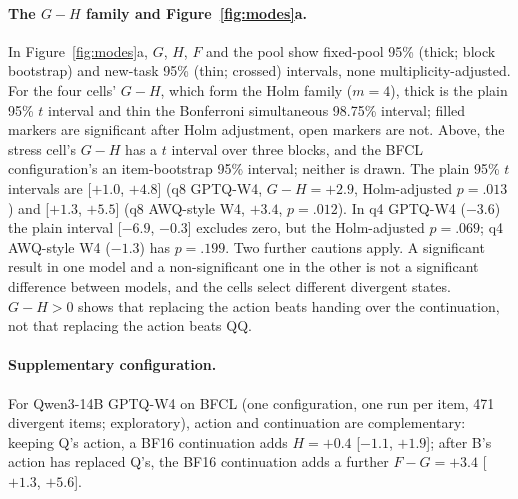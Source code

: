 \paragraph{The $G-H$ family and Figure~\ref{fig:modes}a.} In Figure~\ref{fig:modes}a, $G$, $H$, $F$ and the pool show fixed-pool 95\% (thick; block bootstrap) and new-task 95\% (thin; crossed) intervals, none multiplicity-adjusted. For the four cells' $G-H$, which form the Holm family ($m=4$), thick is the plain 95\% $t$ interval and thin the Bonferroni simultaneous 98.75\% interval; filled markers are significant after Holm adjustment, open markers are not. Above, the stress cell's $G-H$ has a $t$ interval over three blocks, and the BFCL configuration's an item-bootstrap 95\% interval; neither is drawn. %
The plain 95\% $t$ intervals are [$+1.0$, $+4.8$] (q8 GPTQ-W4, $G-H=+2.9$, Holm-adjusted $p=.013$) and [$+1.3$, $+5.5$] (q8 AWQ-style W4, $+3.4$, $p=.012$). In q4 GPTQ-W4 ($-3.6$) the plain interval [$-6.9$, $-0.3$] excludes zero, but the Holm-adjusted $p=.069$; q4 AWQ-style W4 ($-1.3$) has $p=.199$. Two further cautions apply. A significant result in one model and a non-significant one in the other is not a significant difference between models, and the cells select different divergent states. $G-H>0$ shows that replacing the action beats handing over the continuation, not that replacing the action beats QQ. %

\paragraph{Supplementary configuration.} For Qwen3-14B GPTQ-W4 on BFCL (one configuration, one run per item, 471 divergent items; exploratory), action and continuation are complementary: keeping Q's action, a BF16 continuation adds $H=+0.4$ [$-1.1$, $+1.9$]\pp{}; after B's action has replaced Q's, the BF16 continuation adds a further $F-G=+3.4$ [$+1.3$, $+5.6$]\pp{}. %

